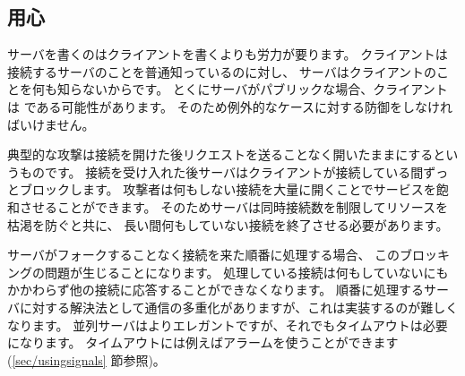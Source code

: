 \subsection*{用心}

サーバを書くのはクライアントを書くよりも労力が要ります。
クライアントは接続するサーバのことを普通知っているのに対し、
サーバはクライアントのことを何も知らないからです。
とくにサーバがパブリックな場合、クライアントは  である可能性があります。
そのため例外的なケースに対する防御をしなければいけません。

典型的な攻撃は接続を開けた後リクエストを送ることなく開いたままにするというものです。
接続を受け入れた後サーバはクライアントが接続している間ずっとブロックします。
攻撃者は何もしない接続を大量に開くことでサービスを飽和させることができます。
そのためサーバは同時接続数を制限してリソースを枯渇を防ぐと共に、
長い間何もしていない接続を終了させる必要があります。


サーバがフォークすることなく接続を来た順番に処理する場合、
このブロッキングの問題が生じることになります。
処理している接続は何もしていないにもかかわらず他の接続に応答することができなくなります。
順番に処理するサーバに対する解決法として通信の多重化がありますが、これは実装するのが難しくなります。
並列サーバはよりエレガントですが、それでもタイムアウトは必要になります。
タイムアウトには例えばアラームを使うことができます(\ref{sec/usingsignals} 節参照)。

